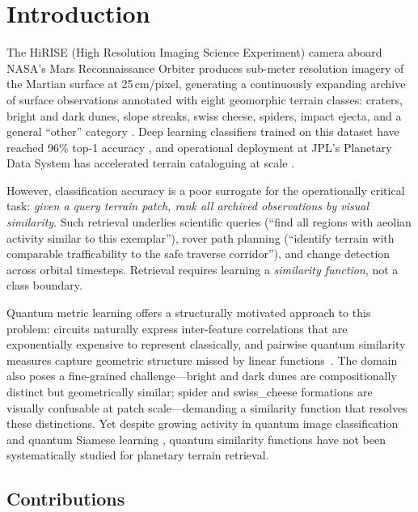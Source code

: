 \documentclass[conference,a4paper]{IEEEtran}
\begin{document}
\section{Introduction}
\label{sec:intro}

The HiRISE (High Resolution Imaging Science Experiment) camera aboard
NASA's Mars Reconnaissance Orbiter produces sub-meter resolution imagery
of the Martian surface at 25\,cm/pixel, generating a continuously expanding
archive of surface observations annotated with eight geomorphic terrain
classes: craters, bright and dark dunes, slope streaks, swiss cheese,
spiders, impact ejecta, and a general ``other'' category
\cite{wagstaff2018deepmars,wagstaff2021mars}.
Deep learning classifiers trained on this dataset have reached 96\%
top-1 accuracy \cite{wagstaff2021mars}, and operational deployment at
JPL's Planetary Data System has accelerated terrain cataloguing at scale
\cite{wagstaff2018deepmars}.

However, classification accuracy is a poor surrogate for the operationally
critical task: \emph{given a query terrain patch, rank all archived
observations by visual similarity}.
Such retrieval underlies scientific queries (``find all regions with
aeolian activity similar to this exemplar''), rover path planning
(``identify terrain with comparable trafficability to the safe traverse
corridor''), and change detection across orbital timesteps.
Retrieval requires learning a \emph{similarity function}, not a class
boundary.

Quantum metric learning offers a structurally motivated approach to this
problem: circuits naturally express inter-feature correlations that are
exponentially expensive to represent classically, and pairwise quantum
similarity measures capture geometric structure missed by linear functions~\cite{lloyd2020embeddings,schuld2019featurehilbert}.
The domain also poses a fine-grained challenge—bright and dark dunes are
compositionally distinct but geometrically similar; spider and swiss\_cheese
formations are visually confusable at patch scale—demanding a similarity
function that resolves these distinctions.
Yet despite growing activity in quantum image classification
\cite{mari2020transfer} and quantum Siamese learning \cite{silver2023sliq},
quantum similarity functions have not been systematically studied for
planetary terrain retrieval.

\subsection{Contributions}
\end{document}
